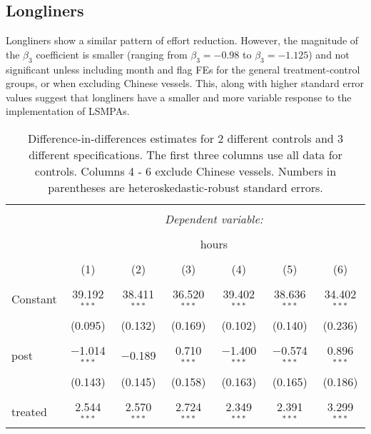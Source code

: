 \documentclass[11pt,]{article}
\begin{document}
\clearpage

\hypertarget{longliners}{%
\subsection{Longliners}\label{longliners}}

Longliners show a similar pattern of effort reduction. However, the
magnitude of the \(\beta_3\) coefficient is smaller (ranging from
\(\beta_3 = -0.98\) to \(\beta_3 = -1.125\)) and not significant unless
including month and flag FEs for the general treatment-control groups,
or when excluding Chinese vessels. This, along with higher standard
error values suggest that longliners have a smaller and more variable
response to the implementation of LSMPAs.

\begin{table}[!htbp] \centering 
  \caption{\label{tab:long}Difference-in-differences estimates for 2 different controls and 3 different specifications. The first three columns use all data for controls. Columns 4 - 6 exclude Chinese vessels. Numbers in parentheses are heteroskedastic-robust standard errors.} 
  \label{} 
\small 
\begin{tabular}{@{\extracolsep{1pt}}lcccccc} 
\\[-1.8ex]\hline 
\hline \\[-1.8ex] 
 & \multicolumn{6}{c}{\textit{Dependent variable:}} \\ 
\cline{2-7} 
\\[-1.8ex] & \multicolumn{6}{c}{hours} \\ 
\\[-1.8ex] & (1) & (2) & (3) & (4) & (5) & (6)\\ 
\hline \\[-1.8ex] 
 Constant & 39.192$^{***}$ & 38.411$^{***}$ & 36.520$^{***}$ & 39.402$^{***}$ & 38.636$^{***}$ & 34.402$^{***}$ \\ 
  & (0.095) & (0.132) & (0.169) & (0.102) & (0.140) & (0.236) \\ 
  & & & & & & \\ 
 post & $-$1.014$^{***}$ & $-$0.189 & 0.710$^{***}$ & $-$1.400$^{***}$ & $-$0.574$^{***}$ & 0.896$^{***}$ \\ 
  & (0.143) & (0.145) & (0.158) & (0.163) & (0.165) & (0.186) \\ 
  & & & & & & \\ 
 treated & 2.544$^{***}$ & 2.570$^{***}$ & 2.724$^{***}$ & 2.349$^{***}$ & 2.391$^{***}$ & 3.299$^{***}$ \\ 

\end{tabular}
\end{table}
\end{document}
